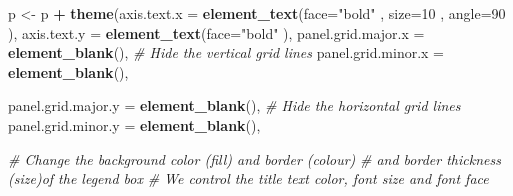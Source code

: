 \documentclass[
]{article}
\newenvironment{Shaded}{\begin{snugshade}}{\end{snugshade}}
\newcommand{\CommentTok}[1]{\textcolor[rgb]{0.56,0.35,0.01}{\textit{#1}}}
\newcommand{\DataTypeTok}[1]{\textcolor[rgb]{0.13,0.29,0.53}{#1}}
\newcommand{\DecValTok}[1]{\textcolor[rgb]{0.00,0.00,0.81}{#1}}
\newcommand{\KeywordTok}[1]{\textcolor[rgb]{0.13,0.29,0.53}{\textbf{#1}}}
\newcommand{\NormalTok}[1]{#1}
\newcommand{\OperatorTok}[1]{\textcolor[rgb]{0.81,0.36,0.00}{\textbf{#1}}}
\newcommand{\StringTok}[1]{\textcolor[rgb]{0.31,0.60,0.02}{#1}}
\begin{document}
\begin{Shaded}
\begin{Highlighting}[]
\NormalTok{p <-}\StringTok{ }\NormalTok{p }\OperatorTok{+}\StringTok{  }\KeywordTok{theme}\NormalTok{(}\DataTypeTok{axis.text.x =} \KeywordTok{element_text}\NormalTok{(}\DataTypeTok{face=}\StringTok{"bold"} 
\NormalTok{                                           ,  }\DataTypeTok{size=}\DecValTok{10}
\NormalTok{                                           , }\DataTypeTok{angle=}\DecValTok{90}
\NormalTok{                                   ),}
        \DataTypeTok{axis.text.y =} \KeywordTok{element_text}\NormalTok{(}\DataTypeTok{face=}\StringTok{"bold"}
\NormalTok{                                   ),}
        \DataTypeTok{panel.grid.major.x =} \KeywordTok{element_blank}\NormalTok{(), }\CommentTok{# Hide the vertical grid lines }
        \DataTypeTok{panel.grid.minor.x =} \KeywordTok{element_blank}\NormalTok{(),}
        
        \DataTypeTok{panel.grid.major.y =} \KeywordTok{element_blank}\NormalTok{(), }\CommentTok{# Hide the horizontal grid lines}
        \DataTypeTok{panel.grid.minor.y =} \KeywordTok{element_blank}\NormalTok{(), }
        
        \CommentTok{# Change the background color (fill) and border (colour)}
        \CommentTok{# and border thickness (size)of the legend box}
        \CommentTok{# We control the title text color, font size and font face}
        

\end{Highlighting}
\end{Shaded}
\end{document}

